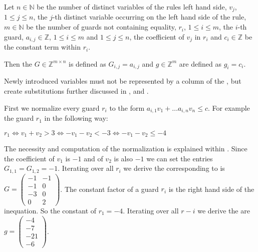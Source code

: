 \begin{definition}
	\label{def:guard}
	Let $n \in \mathbb{N}$ be the number of distinct variables of the \loopt rules left hand side, $v_j$, $1 \le j \le n$, the $j$-th distinct variable occurring on the left hand side of the rule, $m \in \mathbb{N}$ be the number of guards not containing equality, $r_i$, $1\le i \le m$, the $i$-th guard, $a_{i,j} \in \mathbb{Z}$, $1 \le i \le m$ and $1\le j \le n$, the coefficient of $v_j$ in $r_i$ and $c_i \in \mathbb{Z}$ be the constant term within $r_i$.
	
	Then the \guardmatrix $G \in \mathbb{Z}^{m\times n}$ is defined as $G_{i,j}=a_{i,j} $ and \guardconstants $g \in \mathbb{Z}^m$ are defined as $g_i = c_i$.
	
	Newly introduced variables must not be represented by a column of the \guardmatrix, but create substitutions further discussed in ,  and .
\end{definition}

\begin{example}
	\label{ex:guardmatrix-and-constants}
	First we normalize every guard $r_i$ to the form $a_{i,1}v_1+\dots a_{i,n}v_n \le c$. For example the guard $r_1$ in the following way:
	\begin{center}
		$r_1 \Leftrightarrow v_1+v_2 > 3  \Leftrightarrow -v_1-v_2 < -3 \Leftrightarrow -v_1-v_2 \le -4$
	\end{center}
	The necessity and computation of the normalization is explained within .\newline
	Since the coefficient of $v_1$ is $-1$ and of $v_2$ is also $-1$ we can set the entries $G_{1,1} = G_{1,2}=-1$.
	Iterating over all $r_i$ we derive the corresponding \guardmatrix to  is $G = \begin{pmatrix} -1 & -1 \\ -1 & 0 \\ -3 & 0 \\ 0 & 2 \end{pmatrix}$.
	The constant factor of a guard $r_i$ is the right hand side of the inequation. So the constant of $r_1=-4$. Iterating over all $r-i$ we derive the \guardconstants are $g= \begin{pmatrix} -4 \\ -7 \\ -21 \\ -6 \end{pmatrix}$.	
\end{example}

